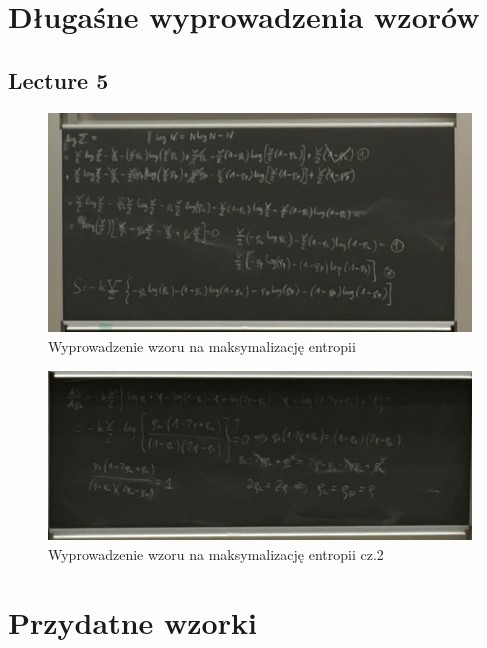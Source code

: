 \documentclass[12pt,a4paper]{report}
\begin{document}
\appendix
\setcounter{table}{0}
\captionsetup[table]{name=Załącznik}
\captionsetup[figure]{name=Załącznik}
\captionsetup[section]{name=Lecture}

\chapter{Długaśne wyprowadzenia wzorów}

\section{Lecture 5}

\begin{figure}[!ht]
    \centering
    \includegraphics[width=\linewidth]{Wyk_5_Rys_2.JPG}
    \caption{Wyprowadzenie wzoru na maksymalizację entropii}
    \label{fig:lec_5:app:maksymalizacja_entropii}
\end{figure}


\begin{figure}[!ht]
    \centering
    \includegraphics[width=\linewidth]{Wyk_5_Rys_3.JPG}
    \caption{Wyprowadzenie wzoru na maksymalizację entropii cz.2}
    \label{fig:lec_5:app:maksymalizacja_entropii_2}
\end{figure}

\chapter{Przydatne wzorki}
\end{document}
